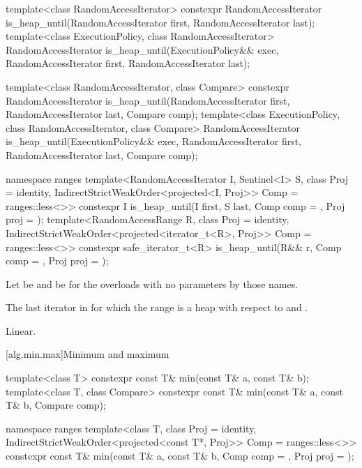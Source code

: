 %
\begin{itemdecl}
template<class RandomAccessIterator>
  constexpr RandomAccessIterator
    is_heap_until(RandomAccessIterator first, RandomAccessIterator last);
template<class ExecutionPolicy, class RandomAccessIterator>
  RandomAccessIterator
    is_heap_until(ExecutionPolicy&& exec,
                  RandomAccessIterator first, RandomAccessIterator last);

template<class RandomAccessIterator, class Compare>
  constexpr RandomAccessIterator
    is_heap_until(RandomAccessIterator first, RandomAccessIterator last,
                  Compare comp);
template<class ExecutionPolicy, class RandomAccessIterator, class Compare>
  RandomAccessIterator
    is_heap_until(ExecutionPolicy&& exec,
                  RandomAccessIterator first, RandomAccessIterator last,
                  Compare comp);

namespace ranges {
  template<RandomAccessIterator I, Sentinel<I> S, class Proj = identity,
      IndirectStrictWeakOrder<projected<I, Proj>> Comp = ranges::less<>>
    constexpr I is_heap_until(I first, S last, Comp comp = {}, Proj proj = {});
  template<RandomAccessRange R, class Proj = identity,
      IndirectStrictWeakOrder<projected<iterator_t<R>, Proj>> Comp = ranges::less<>>
    constexpr safe_iterator_t<R>
      is_heap_until(R&& r, Comp comp = {}, Proj proj = {});
}
\end{itemdecl}

\begin{itemdescr}
\pnum
Let  be 
and  be 
for the overloads with no parameters by those names.

\pnum
\returns
The last iterator  in  for which the
range  is a heap with respect to  and .

\pnum
\complexity Linear.
\end{itemdescr}


[alg.min.max]{Minimum and maximum}

%
\begin{itemdecl}
template<class T> constexpr const T& min(const T& a, const T& b);
template<class T, class Compare>
  constexpr const T& min(const T& a, const T& b, Compare comp);

namespace ranges {
  template<class T, class Proj = identity,
      IndirectStrictWeakOrder<projected<const T*, Proj>> Comp = ranges::less<>>
    constexpr const T& min(const T& a, const T& b, Comp comp = {}, Proj proj = {});
}
\end{itemdecl}

